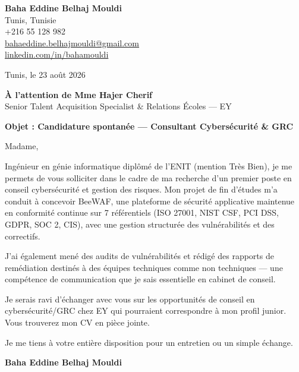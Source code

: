 \documentclass[a4paper,11pt]{article}
\begin{document}
\begin{flushright}
{\bfseries Baha Eddine Belhaj Mouldi}\\
Tunis, Tunisie\\
+216 55 128 982\\
\href{mailto:bahaeddine.belhajmouldi@gmail.com}{bahaeddine.belhajmouldi@gmail.com}\\
\href{https://linkedin.com/in/bahamouldi}{linkedin.com/in/bahamouldi}
\end{flushright}
\vspace{0.8cm}
\begin{flushleft}
Tunis, le 23 ao\^ut 2026
\vspace{0.8cm}

{\bfseries \`A l'attention de Mme Hajer Cherif}\\
Senior Talent Acquisition Specialist \& Relations \'Ecoles --- EY
\vspace{0.6cm}

{\bfseries Objet : Candidature spontan\'ee --- Consultant Cybers\'ecurit\'e \& GRC}
\end{flushleft}
\vspace{0.6cm}
Madame,

Ing\'enieur en g\'enie informatique dipl\^om\'e de l'ENIT (mention Tr\`es Bien), je me permets de vous solliciter dans le cadre de ma recherche d'un premier poste en conseil cybers\'ecurit\'e et gestion des risques. Mon projet de fin d'\'etudes m'a conduit \`a concevoir BeeWAF, une plateforme de s\'ecurit\'e applicative maintenue en conformit\'e continue sur 7 r\'ef\'erentiels (ISO 27001, NIST CSF, PCI DSS, GDPR, SOC 2, CIS), avec une gestion structur\'ee des vuln\'erabilit\'es et des correctifs.

J'ai \'egalement men\'e des audits de vuln\'erabilit\'es et r\'edig\'e des rapports de rem\'ediation destin\'es \`a des \'equipes techniques comme non techniques --- une comp\'etence de communication que je sais essentielle en cabinet de conseil.

Je serais ravi d'\'echanger avec vous sur les opportunit\'es de conseil en cybers\'ecurit\'e/GRC chez EY qui pourraient correspondre \`a mon profil junior. Vous trouverez mon CV en pi\`ece jointe.

Je me tiens \`a votre enti\`ere disposition pour un entretien ou un simple \'echange.

\vspace{0.8cm}
\begin{flushright}
{\bfseries Baha Eddine Belhaj Mouldi}
\end{flushright}
\end{document}
